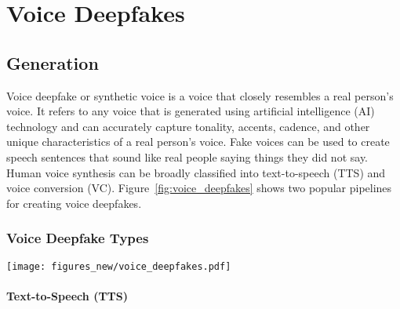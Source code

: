 \section{Voice Deepfakes}\label{sec:voice_deepfakes}

\subsection{Generation}\label{sec:voice_generation}

Voice deepfake or synthetic voice is a voice that closely resembles a real person’s voice. It refers to any voice that is generated using artificial intelligence (AI) technology and can accurately capture tonality, accents, cadence, and other unique characteristics of a real person’s voice. Fake voices can be used to create speech sentences that sound like real people saying things they did not say. Human voice synthesis can be broadly classified into text-to-speech (TTS) and voice conversion (VC). Figure~\ref{fig:voice_deepfakes} shows two popular pipelines for creating voice deepfakes.

\subsubsection{Voice Deepfake Types}

\begin{figure*}
    \centering
    \texttt{[image: figures\_new/voice\_deepfakes.pdf]}
    \caption{Two popular methods for creating voice deepfakes: (a) Text-to-speech and (b) Voice conversion. [REDONE]}
    \label{fig:voice_deepfakes}
\end{figure*}

\paragraph{Text-to-Speech (TTS)}


